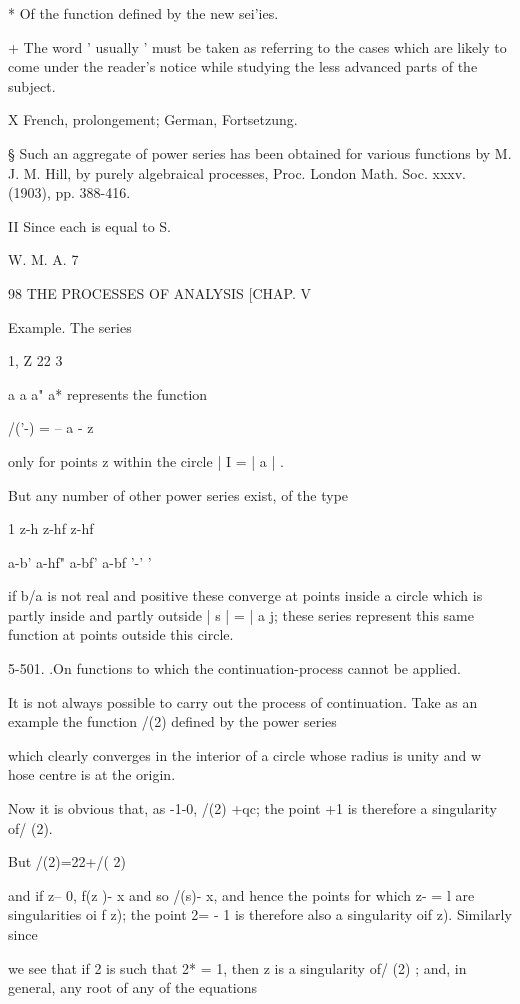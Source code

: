 {{* Of the function defined by the new sei'ies.

+ The word ' usually ' must be taken as referring to the cases which
are likely to come under the reader's notice while studying the less
advanced parts of the subject.

X French, prolongement; German, Fortsetzung.

§ Such an aggregate of power series has been obtained for various
functions by M. J. M. Hill, by purely algebraical processes, Proc.
London Math. Soc. xxxv. (1903), pp. 388-416.

II Since each is equal to S.

W. M. A. 7

98 THE PROCESSES OF ANALYSIS [CHAP. V

Example. The series

1, Z 22 3

a a a" a* represents the function

/('-) = -- a - z

only for points z within the circle | I = | a | .

But any number of other power series exist, of the type

1 z-h z-hf z-hf

a-b' a-hf" a-bf' a-bf '-' '

if b/a is not real and positive these converge at points inside a
circle which is partly inside and partly outside | s | = | a j; these
series represent this same function at points outside this circle.

5-501. .On functions to which the continuation-process cannot be
applied.

It is not always possible to carry out the process of continuation.
Take as an example the function /(2) defined by the power series

which clearly converges in the interior of a circle whose radius is
unity and w hose centre is at the origin.

Now it is obvious that, as -1-0, /(2) +qc; the point +1 is therefore
a singularity of/ (2).

But /(2)=22+/( 2)

and if z-- 0, f(z )- x and so /(s)- x, and hence the points for which
z- = l are singularities oi f z); the point 2= - 1 is therefore also
a singularity oif z). Similarly since

we see that if 2 is such that 2* = 1, then z is a singularity of/ (2)
; and, in general, any root of any of the equations

}}
